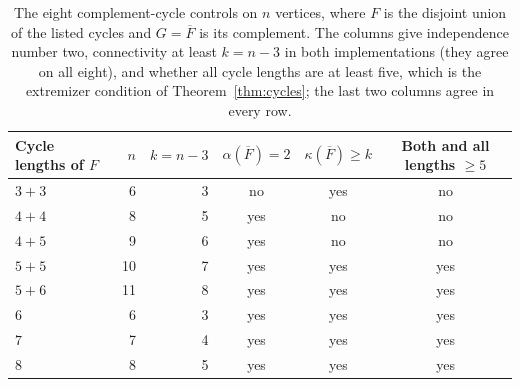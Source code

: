 \begin{table}[ht]
\centering\small
\begin{tabular}{lrrccc}
\toprule
Cycle lengths of $F$ & $n$ & $k=n-3$ & $\alpha(\overline F)=2$ & $\kappa(\overline F)\ge k$ & Both and all lengths $\ge5$\\
\midrule
$3+3$ & 6 & 3 & no & yes & no\\
$4+4$ & 8 & 5 & yes & no & no\\
$4+5$ & 9 & 6 & yes & no & no\\
$5+5$ & 10 & 7 & yes & yes & yes\\
$5+6$ & 11 & 8 & yes & yes & yes\\
$6$ & 6 & 3 & yes & yes & yes\\
$7$ & 7 & 4 & yes & yes & yes\\
$8$ & 8 & 5 & yes & yes & yes\\
\bottomrule
\end{tabular}
\caption{The eight complement-cycle controls on $n$ vertices, where $F$ is the disjoint union of the listed cycles and $G=\overline F$ is its complement. The columns give independence number two, connectivity at least $k=n-3$ in both implementations (they agree on all eight), and whether all cycle lengths are at least five, which is the extremizer condition of Theorem~\ref{thm:cycles}; the last two columns agree in every row.}
\label{tab:controls}
\end{table}

